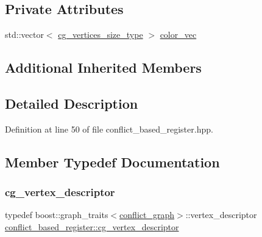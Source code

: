 \subsection*{Private Attributes}
\begin{DoxyCompactItemize}
\item 
std\+::vector$<$ \hyperlink{classconflict__based__register_a7708aaa8ca3c7edc5006102d258ce126}{cg\+\_\+vertices\+\_\+size\+\_\+type} $>$ \hyperlink{classconflict__based__register_af97bd1e6d47a4205d227f72319a234e0}{color\+\_\+vec}
\end{DoxyCompactItemize}
\subsection*{Additional Inherited Members}


\subsection{Detailed Description}


Definition at line 50 of file conflict\+\_\+based\+\_\+register.\+hpp.



\subsection{Member Typedef Documentation}
\mbox{\label{classconflict__based__register_abddaef9f848ebfcf63783a6a3749ca78}} 
\subsubsection{\texorpdfstring{cg\+\_\+vertex\+\_\+descriptor}{cg\_vertex\_descriptor}}
{\footnotesize\ttfamily typedef boost\+::graph\+\_\+traits$<$\hyperlink{classconflict__based__register_ae3dddabefe4d2f171c7076d0c1c22f05}{conflict\+\_\+graph}$>$\+::vertex\+\_\+descriptor \hyperlink{classconflict__based__register_abddaef9f848ebfcf63783a6a3749ca78}{conflict\+\_\+based\+\_\+register\+::cg\+\_\+vertex\+\_\+descriptor}\hspace{0.3cm}{\ttfamily [protected]}}



